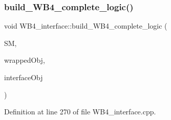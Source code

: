\subsubsection{\texorpdfstring{build\+\_\+\+W\+B4\+\_\+complete\+\_\+logic()}{build\_WB4\_complete\_logic()}}
{\footnotesize\ttfamily void W\+B4\+\_\+interface\+::build\+\_\+\+W\+B4\+\_\+complete\+\_\+logic (\begin{DoxyParamCaption}\item[{\hyperlink{structural__manager_8hpp_ab3136f0e785d8535f8d252a7b53db5b5}{structural\+\_\+manager\+Ref}}]{SM,  }\item[{\hyperlink{structural__objects_8hpp_a8ea5f8cc50ab8f4c31e2751074ff60b2}{structural\+\_\+object\+Ref}}]{wrapped\+Obj,  }\item[{\hyperlink{structural__objects_8hpp_a8ea5f8cc50ab8f4c31e2751074ff60b2}{structural\+\_\+object\+Ref}}]{interface\+Obj }\end{DoxyParamCaption})\hspace{0.3cm}{\ttfamily [protected]}}



Definition at line 270 of file W\+B4\+\_\+interface.\+cpp.



